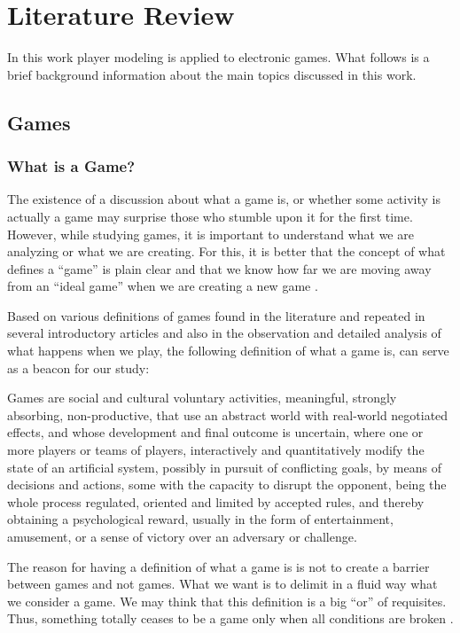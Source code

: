 \chapter{Literature Review}
In this work player modeling is applied to electronic games. What follows is a brief background information about the main topics discussed in this work.

\section{Games}
\subsection{What is a Game?}
The existence of a discussion about what a game is, or whether some activity is actually a game may surprise those who stumble upon it for the first time. However, while studying games, it is important to understand what we are analyzing or what we are creating. For this, it is better that the concept of what defines a \enquote{game} is plain clear and that we know how far we are moving away from an \enquote{ideal game} when we are creating a new game \citep{XexeoGeraldoquesaoJogos2013}.

Based on various definitions of games found in the literature and repeated in several introductory articles and also in the observation and detailed analysis of what happens when we play, the following definition of what a game is, can serve as a beacon for our study:

\begin{displayquote}
	Games are social and cultural voluntary activities, meaningful, strongly absorbing, non-productive, that use an abstract world with real-world negotiated effects, and whose development and final outcome is uncertain, where one or more players or teams of players, interactively and quantitatively modify the state of an artificial system, possibly in pursuit of conflicting goals, by means of decisions and actions, some with the capacity to disrupt the opponent, being the whole process regulated, oriented and limited by accepted rules, and thereby obtaining a psychological reward, usually in the form of entertainment, amusement, or a sense of victory over an adversary or challenge.
\end{displayquote}

The reason for having a definition of what a game is is not to create a barrier between games and not games. What we want is to delimit in a fluid way what we consider a game. We may think that this definition is a big \enquote{or} of requisites. Thus, something totally ceases to be a game only when all conditions are broken  \citep{XexeoGeraldoquesaoJogos2013}.

